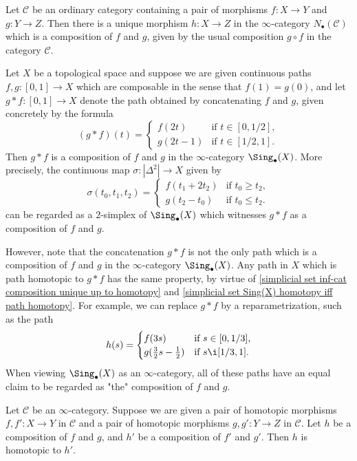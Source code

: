\begin{example}
Let $\mathcal{C}$ be an ordinary category containing a pair of morphisms $f:X\to Y$ and $g:Y\to Z$. Then there is a unique morphism $h:X\to Z$ in the $\infty$-category $N_\bullet(\mathcal{C})$ which is a composition of $f$ and $g$, given by the usual composition $g\circ f$ in the category $\mathcal{C}$.
\end{example}
\begin{example}
Let $X$ be a topological space and suppose we are given continuous paths $f,g:[0,1]\to X$ which are composable in the sense that $f(1)=g(0)$, and let $g\ast f:[0,1]\to X$ denote the path obtained by concatenating $f$ and $g$, given concretely by the formula
\[(g\ast f)(t)=\begin{cases}
f(2t)&\text{if $t\in[0,1/2]$},\\
g(2t-1)&\text{if $t\in[1/2,1]$}.
\end{cases}\]
Then $g\ast f$ is a composition of $f$ and $g$ in the $\infty$-category $\Sing_\bullet(X)$. More precisely, the continuous map $\sigma:|\Delta^2|\to X$ given by
\[\sigma(t_0,t_1,t_2)=\begin{cases}
f(t_1+2t_2)&\text{if $t_0\geq t_2$},\\
g(t_2-t_0)&\text{if $t_0\leq t_2$}.
\end{cases}\]
can be regarded as a $2$-simplex of $\Sing_\bullet(X)$ which witnesses $g\ast f$ as a composition of $f$ and $g$.\par
However, note that the concatenation $g\ast f$ is not the only path which is a composition of $f$ and $g$ in the $\infty$-category $\Sing_\bullet(X)$. Any path in $X$ which is path homotopic to $g\ast f$ has the same property, by virtue of \cref{simplicial set inf-cat composition unique up to homotopy} and \cref{simplicial set Sing(X) homotopy iff path homotopy}. For example, we can replace $g\ast f$ by a reparametrization, such as the path
\[h(s)=\begin{cases}
f(3s)&\text{if $s\in[0,1/3]$},\\
g(\frac{3}{2}s-\frac{1}{2})&\text{if $s\i[1/3,1]$}.
\end{cases}\]
When viewing $\Sing_\bullet(X)$ as an $\infty$-category, all of these paths have an equal claim to be regarded as "the" composition of $f$ and $g$.
\end{example}
\begin{proposition}\label{simplicial set inf-cat composotion respect homotopy}
Let $\mathcal{C}$ be an $\infty$-category. Suppose we are given a pair of homotopic morphisms $f,f':X\to Y$ in $\mathcal{C}$ and a pair of homotopic morphisms $g,g':Y\to Z$ in $\mathcal{C}$. Let $h$ be a composition of $f$ and $g$, and $h'$ be a composition of $f'$ and $g'$. Then $h$ is homotopic to $h'$.
\end{proposition}
